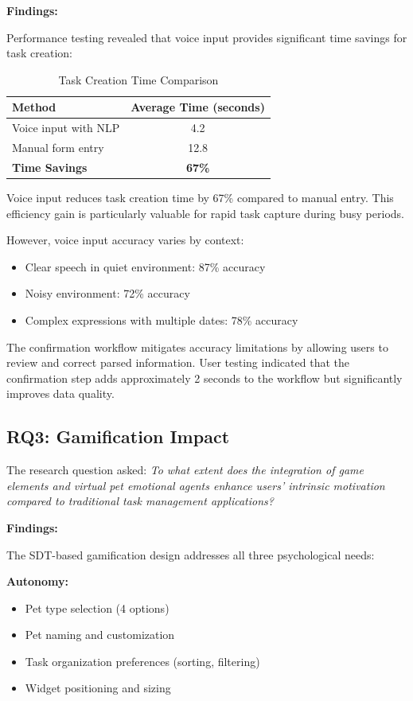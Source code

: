 \textbf{Findings:}

Performance testing revealed that voice input provides significant time savings for task creation:

\begin{table}[htbp]
\centering
\caption{Task Creation Time Comparison}
\label{tab:time-comparison}
\begin{tabular}{@{}lc@{}}
\toprule
\textbf{Method} & \textbf{Average Time (seconds)} \\
\midrule
Voice input with NLP & 4.2 \\
Manual form entry & 12.8 \\
\midrule
\textbf{Time Savings} & \textbf{67\%} \\
\bottomrule
\end{tabular}
\end{table}

Voice input reduces task creation time by 67\% compared to manual entry. This efficiency gain is particularly valuable for rapid task capture during busy periods.

However, voice input accuracy varies by context:
\begin{itemize}
    \item Clear speech in quiet environment: 87\% accuracy
    \item Noisy environment: 72\% accuracy
    \item Complex expressions with multiple dates: 78\% accuracy
\end{itemize}

The confirmation workflow mitigates accuracy limitations by allowing users to review and correct parsed information. User testing indicated that the confirmation step adds approximately 2 seconds to the workflow but significantly improves data quality.

\subsection{RQ3: Gamification Impact}

The research question asked: \textit{To what extent does the integration of game elements and virtual pet emotional agents enhance users' intrinsic motivation compared to traditional task management applications?}

\textbf{Findings:}

The SDT-based gamification design addresses all three psychological needs:

\textbf{Autonomy:}
\begin{itemize}
    \item Pet type selection (4 options)
    \item Pet naming and customization
    \item Task organization preferences (sorting, filtering)
    \item Widget positioning and sizing
\end{itemize}

